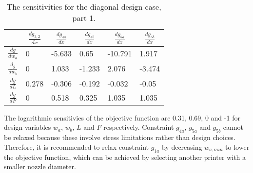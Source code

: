 \begin{table}[]
	\centering
	\begin{tabular}{|c|l|l|l|l|l|}
		\hline
		\textbf{}                    & \multicolumn{1}{c|}{\textbf{$\frac{d g_{3,2} }{d  x}$}} & \multicolumn{1}{c|}{\textbf{$\frac{d g_{4a}}{d  x}$}} & \multicolumn{1}{c|}{\textbf{$\frac{d g_{4b}}{d  x}$}} & \multicolumn{1}{c|}{\textbf{$\frac{d g_{5a}}{d  x}$}} & \multicolumn{1}{c|}{\textbf{$\frac{d g_{5b}}{d  x}$}} \\ \hline
		\textbf{$\frac{d g}{dw_a}$}  & 0                                                       & \cellcolor[HTML]{9AFF99}-5.633                        & 0.65                                                  & \cellcolor[HTML]{9AFF99}-10.791                       & 1.917                                                 \\ \hline
		\textbf{$\frac{d_g}{d w_b}$} & 0                                                       & 1.033                                                 & -1.233                                                & 2.076                                                 & \cellcolor[HTML]{9AFF99}-3.474                        \\ \hline
		\textbf{$\frac{d g}{d L}$}   & 0.278                                                   & \cellcolor[HTML]{9AFF99}-0.306                        & -0.192                                                & \cellcolor[HTML]{9AFF99}-0.032                        & \cellcolor[HTML]{9AFF99}-0.05                         \\ \hline
		\textbf{$\frac{dg}{d F}$}    & 0                                                       & \cellcolor[HTML]{9AFF99}0.518                         & 0.325                                                 & \cellcolor[HTML]{9AFF99}1.035                         & \cellcolor[HTML]{9AFF99}1.035                         \\ \hline
	\end{tabular}
	\caption{The sensitivities for the diagonal design case, part 1.}
	\label{tab:diagsens2}
\end{table}


The logarithmic sensitivies of the objective function are 0.31, 0.69, 0 and -1 for design variables $w_a$, $w_b$, $L$ and $F$ respectively. Constraint $g_{4a}$, $g_{5a}$ and $g_{5b}$ cannot be relaxed because these involve stress limitations rather than design choices. Therefore, it is recommended to relax constraint $g_{1a}$ by decreasing $w_{a,min}$ to lower the objective function, which can be achieved by selecting another printer with a smaller nozzle diameter.




